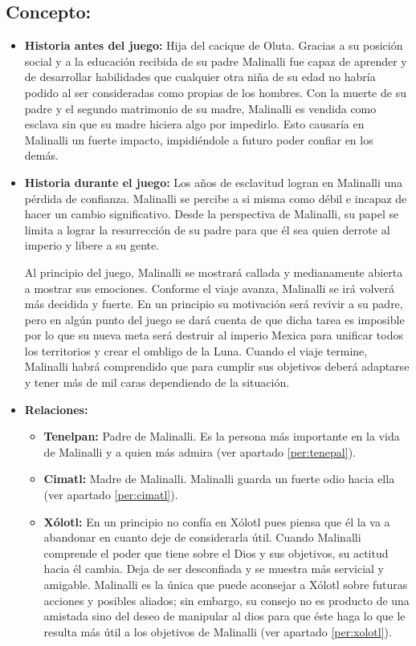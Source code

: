 \subsection{Concepto:}
\begin{itemize}
	\item \textbf{Historia antes del juego:}
	Hija del cacique de Oluta. Gracias a su posición social y a la educación recibida de su padre Malinalli fue capaz de aprender y de desarrollar habilidades que cualquier otra niña de su edad no habría podido al ser consideradas como propias de los hombres. Con la muerte de su padre y el segundo matrimonio de su madre, Malinalli es vendida como esclava sin que su madre hiciera algo por impedirlo. Esto causaría en Malinalli un fuerte impacto, impidiéndole a futuro poder confiar en los demás.
	\item \textbf{Historia durante el juego:}
	Los años de esclavitud logran en Malinalli una pérdida de confianza. Malinalli se percibe a si misma como débil e incapaz de hacer un cambio significativo. Desde la perspectiva de Malinalli, su papel se limita a lograr la resurrección de su padre para que él sea quien derrote al imperio y libere a su gente.
	\\
	\par 
	Al principio del juego, Malinalli se mostrará callada y medianamente abierta a mostrar sus emociones. Conforme el viaje avanza, Malinalli se irá volverá más decidida y fuerte. En un principio su motivación será revivir a su padre, pero en algún punto del juego se dará cuenta de que dicha tarea es imposible por lo que su nueva meta será destruir al imperio Mexica para unificar todos los territorios y crear el ombligo de la Luna. Cuando el viaje termine, Malinalli habrá comprendido que para cumplir sus objetivos deberá adaptarse y tener más de mil caras dependiendo de la situación.
	
	\item \textbf{Relaciones:}
	\begin{itemize}
		\item \textbf{Tenelpan:} Padre de Malinalli. Es la persona más importante en la vida de Malinalli y a quien más admira (ver apartado \ref{per:tenepal}).
		\item \textbf{Cimatl: } Madre de Malinalli. Malinalli guarda un fuerte odio hacia ella (ver apartado \ref{per:cimatl}).
		\item \textbf{Xólotl:} En un principio no confía en Xólotl pues piensa que él la va a abandonar en cuanto deje de considerarla útil. Cuando Malinalli comprende el poder que tiene sobre el Dios y sus objetivos, su actitud hacia él cambia. Deja de ser desconfiada y se muestra más servicial y amigable. Malinalli es la única que puede aconsejar a Xólotl sobre futuras acciones y posibles aliados; sin embargo, su consejo no es producto de una amistada sino del deseo de manipular al dios para que éste haga lo que le resulta más útil a los objetivos de Malinalli (ver apartado \ref{per:xolotl}). 
	\end{itemize}			  
\end{itemize}


